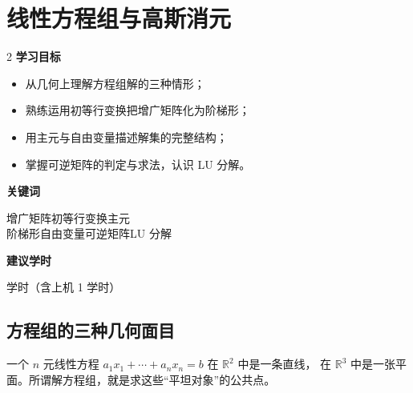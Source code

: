 \documentclass[11pt,a4paper,openany]{ctexbook}
\newcommand{\Rnum}[1]{\mathbb{R}^{#1}}
\begin{document}
\chapter{线性方程组与高斯消元}
\label{ch:gauss}

\begin{chapoutline}
\small
\begin{multicols}{2}
\textbf{学习目标}
\begin{itemize}[leftmargin=1.5em, itemsep=1.5pt]
\item 从几何上理解方程组解的三种情形；
\item 熟练运用初等行变换把增广矩阵化为阶梯形；
\item 用主元与自由变量描述解集的完整结构；
\item 掌握可逆矩阵的判定与求法，认识 LU 分解。
\end{itemize}
\columnbreak
\textbf{关键词}
\par\smallskip
增广矩阵\quad 初等行变换\quad 主元\\
阶梯形\quad 自由变量\quad 可逆矩阵\quad LU 分解
\par\smallskip
\textbf{建议学时}
\par{} 学时（含上机 1 学时）
\end{multicols}
\end{chapoutline}

\section{方程组的三种几何面目}

一个 $n$ 元线性方程 $a_1x_1+\cdots+a_nx_n=b$ 在 $\Rnum{2}$ 中是一条直线，
在 $\Rnum{3}$ 中是一张平面。所谓解方程组，就是求这些“平坦对象”的公共点。
\end{document}
